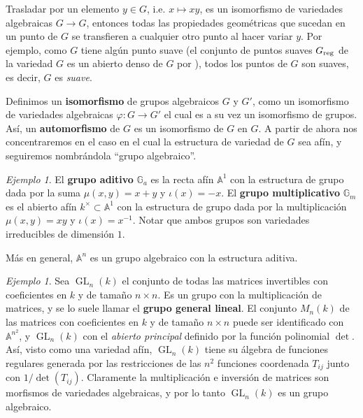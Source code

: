 \documentclass[spanish,12pt]{amsart}
\theoremstyle{definition}
\theoremstyle{remark}
\newtheorem{example}[theorem]{Ejemplo}
\numberwithin{equation}{section}
\newcommand{\afine}[1]{\mathbb{A}^{#1}}
\begin{document}
Trasladar por un elemento $y \in G$, i.e. $x \mapsto x y$, es un isomorfismo de variedades algebraicas $G \to G$, entonces todas las propiedades geométricas que sucedan en un punto de $G$ se transfieren a cualquier otro punto al hacer variar $y$. Por ejemplo, como $G$ tiene algún punto suave (el conjunto de puntos suaves $G_{\textup{reg}}$ de la variedad $G$ es un abierto denso de $G$ por \cite[Teorema 2.13.12]{notas_pedro}), todos los puntos de $G$ son suaves, es decir, $G$ es \textit{suave}.

Definimos un \textbf{isomorfismo} de grupos algebraicos $G$ y $G'$, como un isomorfismo de variedades algebraicas $\varphi : G \to G'$ el cual es a su vez un isomorfismo de grupos. Así, un \textbf{automorfismo} de $G$ es un isomorfismo de $G$ en $G$. A partir de ahora nos concentraremos en el caso en el cual la estructura de variedad de $G$ sea afín, y seguiremos nombrándola ``grupo algebraico''.

\begin{example}
El \textbf{grupo aditivo} $\mathbb{G}_a$ es la recta afín $\afine 1$ con la estructura de grupo dada por la suma $\mu (x,y) = x + y$ y $\iota (x) = -x$. El \textbf{grupo multiplicativo} $\mathbb{G}_m$ es el abierto afín $k^\times \subset \afine 1$ con la estructura de grupo dada por la multiplicación $\mu (x,y) = xy$ y $\iota (x) = x^{-1}$. Notar que ambos grupos son variedades irreducibles de dimensión $1$.

Más en general, $\afine n$ es un grupo algebraico con la estructura aditiva.
\end{example}

\begin{example}
Sea $\operatorname{GL}_n (k)$ el conjunto de todas las matrices invertibles con coeficientes en $k$ y de tamaño $n \times n$. Es un grupo con la multiplicación de matrices, y se lo suele llamar el \textbf{grupo general lineal}. El conjunto $M_n (k)$ de las matrices con coeficientes en $k$ y de tamaño $n \times n$ puede ser identificado con $\afine {n^2}$, y $\operatorname{GL}_n (k)$ con el \textit{abierto principal} definido por la función polinomial $\det$. Así, visto como una variedad afín, $\operatorname{GL}_n (k)$ tiene su álgebra de funciones regulares generada por las restricciones de las $n^2$ funciones coordenada $T_{ij}$ junto con $1 / \det (T_{ij})$. Claramente la multiplicación e inversión de matrices son morfismos de variedades algebraicas, y por lo tanto $\operatorname{GL}_n (k)$ es un grupo algebraico.
\end{example}
\end{document}
